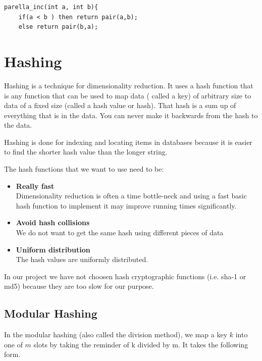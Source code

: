 \documentclass[12pt]{article}
\begin{document}
\begin{lstlisting}
parella_inc(int a, int b){
	if(a < b ) then return pair(a,b);
	else return pair(b,a);
 \end{lstlisting}
 
\section{Hashing}

Hashing is a technique for dimensionality reduction. It uses a hash function that is any function that can be used to map data ( called a key) of arbitrary size to data of a fixed size (called a hash value or hash). That hash is a sum up of everything that is in the data. You can never make it backwards from the hash to the data.

Hashing is done for indexing and locating items in databases because it is easier to find the shorter hash value than the longer string.

The hash functions that we want to use need to be: 

\begin{itemize}
\item \textbf{Really fast}\\
Dimensionality reduction is often a time bottle-neck and using a fast basic hash function to implement it may improve running times significantly. 
\item \textbf{Avoid hash collisions}\\
We do not want to get the same hash using different pieces of data %
\item \textbf{Uniform distribution}\\
The hash values are uniformly distributed.

\end{itemize}

In our project we have not choosen hash cryptographic functions (i.e. sha-1 or md5) because they are too slow for our purpose.

\subsection{Modular Hashing}

In the modular hashing (also called the division method), we map a key $k$ into one of $m$ slots by taking the reminder of k divided by m. It takes the following form. 
\end{document}
